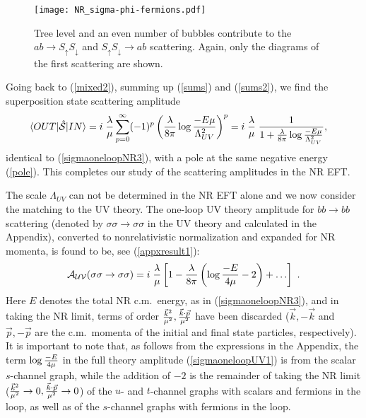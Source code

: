 \documentclass[11pt]{article}
\begin{document}
\begin{figure}[t] %
   \centering
   \texttt{[image: NR\_sigma-phi-fermions.pdf]} 
   \caption{Tree level and an even  number of bubbles contribute to the $ab \rightarrow S_\uparrow S_\downarrow$ and $S_\uparrow S_\downarrow \rightarrow ab $ scattering. Again, only the diagrams of the first scattering are shown.}
	\label{sbubbles3}
\end{figure}
Going back to (\ref{mixed2}), summing up (\ref{sums}) and (\ref{sums2}), we find
 the superposition state scattering amplitude \begin{align}\label{mixedbubbles1}
\langle OUT| \hat  {\cal{S}} |IN\rangle  &=   i \; {\lambda \over   \mu} \sum\limits_{p=0}^\infty (-1)^p \left( {\lambda \over 8 \pi} \log {- E \mu \over \Lambda_{UV}^2}\right)^p 
 =   i \;{\lambda \over \mu} \;{1 \over 1 +{\lambda \over 8 \pi} \log {- E \mu \over \Lambda_{UV}^2}},
 \end{align}
identical to (\ref{sigmaoneloopNR3}), with a pole at the same negative energy (\ref{pole}). This completes our study of the scattering amplitudes in the NR EFT. 
 
The scale $\Lambda_{UV}$ can not be determined in the NR EFT alone and we now consider the matching to the UV theory. 
The one-loop UV theory amplitude for $bb \rightarrow bb$ scattering (denoted by $\sigma\sigma\rightarrow \sigma\sigma$ in the UV theory and calculated in the Appendix), converted to nonrelativistic normalization and expanded for NR momenta, is found to be, see (\ref{appxresult1}):
\begin{equation}
\label{sigmaoneloopUV1}
{\cal{A}_{UV}(\sigma\sigma \rightarrow \sigma\sigma)} =  i \;{ \lambda \over \mu} \left[ 1 - {\lambda \over 8 \pi}\left(\log {- E \over 4 \mu } - 2\right) + \ldots\right]~.
\end{equation}
Here $E$ denotes the  total NR c.m.~energy, as in (\ref{sigmaoneloopNR3}), and in taking the NR limit, terms of order  ${\vec{k}^2 \over \mu^2}, {\vec{k}\cdot\vec{p} \over \mu^2}$ have been discarded  ($\vec{k}, -\vec{k}$ and $\vec{p}, -\vec{p}$ are  the c.m.~momenta of the initial and final state particles, respectively). 
It is important to note that, as follows from the expressions in the Appendix, the term $\log {-E\over 4\mu}$ in the full theory amplitude (\ref{sigmaoneloopUV1}) is from the scalar $s$-channel graph, while the addition of $-2$ is the remainder of taking the NR limit (${\vec{k}^2 \over \mu^2}\rightarrow 0, {\vec{k}\cdot\vec{p} \over \mu^2} \rightarrow 0$) of the $u$- and $t$-channel graphs with  scalars and fermions in the loop, as well as of   the $s$-channel graphs with fermions in the loop. 
\end{document}
